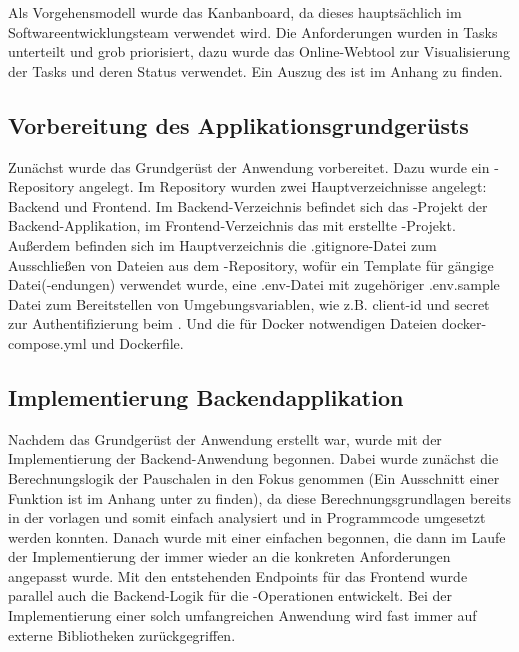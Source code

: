 Als Vorgehensmodell wurde das Kanbanboard, da dieses hauptsächlich im Softwareentwicklungsteam verwendet wird. Die Anforderungen wurden in Tasks unterteilt und grob priorisiert, dazu wurde das Online-Webtool  zur Visualisierung der Tasks und deren Status verwendet.
Ein Auszug des  ist im Anhang zu finden.

\subsection{Vorbereitung des Applikationsgrundgerüsts}

Zunächst wurde das Grundgerüst der Anwendung vorbereitet. Dazu wurde ein -Repository angelegt. Im Repository wurden zwei Hauptverzeichnisse angelegt: Backend und Frontend. Im Backend-Verzeichnis befindet sich das -Projekt der Backend-Applikation, im Frontend-Verzeichnis das mit  erstellte  -Projekt. Außerdem befinden sich im Hauptverzeichnis die .gitignore-Datei zum Ausschließen von Dateien aus dem -Repository, wofür ein Template für gängige Datei(-endungen) verwendet wurde, eine .env-Datei mit zugehöriger .env.sample Datei zum Bereitstellen von Umgebungsvariablen, wie z.B. client-id und secret zur Authentifizierung beim . Und die für Docker notwendigen Dateien docker-compose.yml und Dockerfile.

\subsection{Implementierung Backendapplikation}

Nachdem das Grundgerüst der Anwendung erstellt war, wurde mit der Implementierung der Backend-Anwendung begonnen. Dabei wurde zunächst die Berechnungslogik der Pauschalen in den Fokus genommen (Ein Ausschnitt einer Funktion ist im Anhang unter  zu finden), da diese Berechnungsgrundlagen bereits in der  vorlagen und somit einfach analysiert und in Programmcode umgesetzt werden konnten. Danach wurde mit einer einfachen   begonnen, die dann im Laufe der Implementierung der  immer wieder an die konkreten Anforderungen angepasst wurde. Mit den entstehenden Endpoints für das Frontend wurde parallel auch die Backend-Logik für die -Operationen entwickelt. Bei der Implementierung einer solch umfangreichen Anwendung wird fast immer auf externe Bibliotheken zurückgegriffen.


